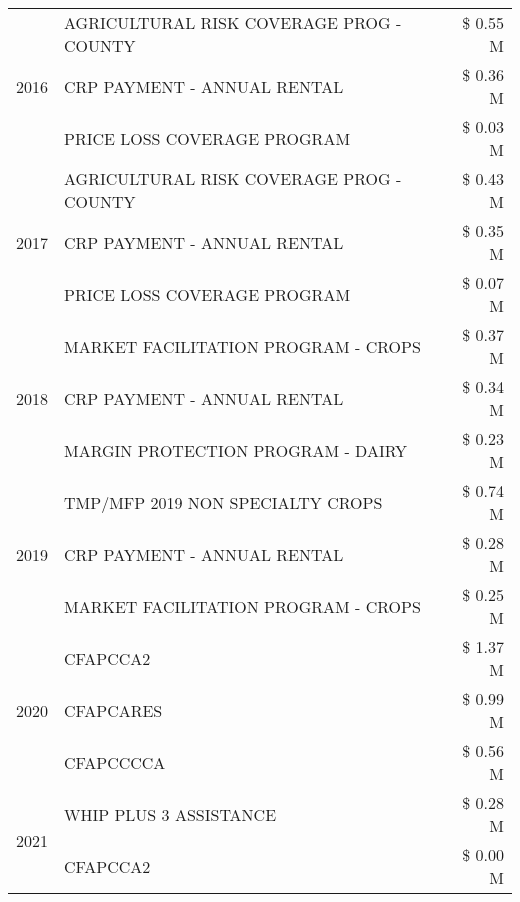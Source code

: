 \begin{tabular}{llr}
\cline{1-3}
\multirow[t]{3}{*}{2016} & AGRICULTURAL RISK COVERAGE PROG - COUNTY & \$ 0.55 M \\
 & CRP PAYMENT - ANNUAL RENTAL & \$ 0.36 M \\
 & PRICE LOSS COVERAGE PROGRAM & \$ 0.03 M \\
\cline{1-3}
\multirow[t]{3}{*}{2017} & AGRICULTURAL RISK COVERAGE PROG - COUNTY & \$ 0.43 M \\
 & CRP PAYMENT - ANNUAL RENTAL & \$ 0.35 M \\
 & PRICE LOSS COVERAGE PROGRAM & \$ 0.07 M \\
\cline{1-3}
\multirow[t]{3}{*}{2018} & MARKET FACILITATION PROGRAM - CROPS & \$ 0.37 M \\
 & CRP PAYMENT - ANNUAL RENTAL & \$ 0.34 M \\
 & MARGIN PROTECTION PROGRAM - DAIRY & \$ 0.23 M \\
\cline{1-3}
\multirow[t]{3}{*}{2019} & TMP/MFP 2019 NON SPECIALTY CROPS & \$ 0.74 M \\
 & CRP PAYMENT - ANNUAL RENTAL & \$ 0.28 M \\
 & MARKET FACILITATION PROGRAM - CROPS & \$ 0.25 M \\
\cline{1-3}
\multirow[t]{3}{*}{2020} & CFAPCCA2 & \$ 1.37 M \\
 & CFAPCARES & \$ 0.99 M \\
 & CFAPCCCCA & \$ 0.56 M \\
\cline{1-3}
\multirow[t]{2}{*}{2021} & WHIP PLUS 3 ASSISTANCE & \$ 0.28 M \\
 & CFAPCCA2 & \$ 0.00 M \\
\cline{1-3}
\bottomrule
\end{tabular}
